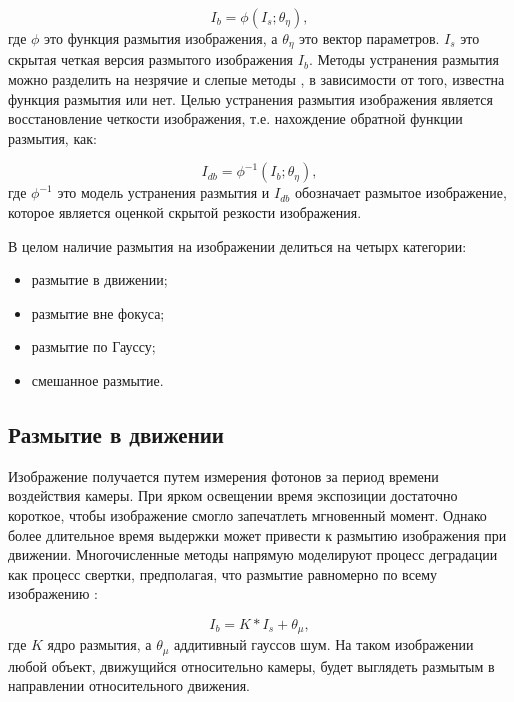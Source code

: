 \begin{equation}
	I_{b} = \phi(I_{s}; \theta_{\eta}),
\end{equation}
где \(\phi\) это функция размытия изображения, а \(\theta_{\eta}\) это вектор параметров. \(I_{s}\) это скрытая четкая версия размытого изображения \(I_{b}\). Методы устранения размытия можно разделить на незрячие и слепые методы \cite{zhang2022deep}, в зависимости от того, известна функция размытия или нет. Целью устранения размытия изображения является восстановление четкости изображения, т.е. нахождение обратной функции размытия, как:

\begin{equation}
	I_{db} = \phi^{-1}(I_{b}; \theta_{\eta}),
\end{equation}
где \(\phi^{-1}\) это модель устранения размытия и \(I_{db}\) обозначает размытое изображение, которое является оценкой скрытой резкости изображения.

В целом наличие размытия на изображении делиться на четырх категории:

\begin{itemize}
	\item размытие в движении;
	\item размытие вне фокуса;
	\item размытие по Гауссу;
	\item смешанное размытие.
\end{itemize}

\subsection{Размытие в движении}

Изображение получается путем измерения фотонов за период времени воздействия камеры. При ярком освещении время экспозиции достаточно короткое, чтобы изображение смогло запечатлеть мгновенный момент. Однако более длительное время выдержки может привести к размытию изображения при движении. Многочисленные методы напрямую моделируют процесс деградации как процесс свертки, предполагая, что размытие равномерно по всему изображению \cite{gao2019dynamic}:

\begin{equation}
	I_{b} = K * I_{s} + \theta_{\mu},
\end{equation}
где \(K\) ядро размытия, а \(\theta_{\mu}\) аддитивный гауссов шум. На таком изображении любой объект, движущийся относительно камеры, будет выглядеть размытым в направлении относительного движения.

